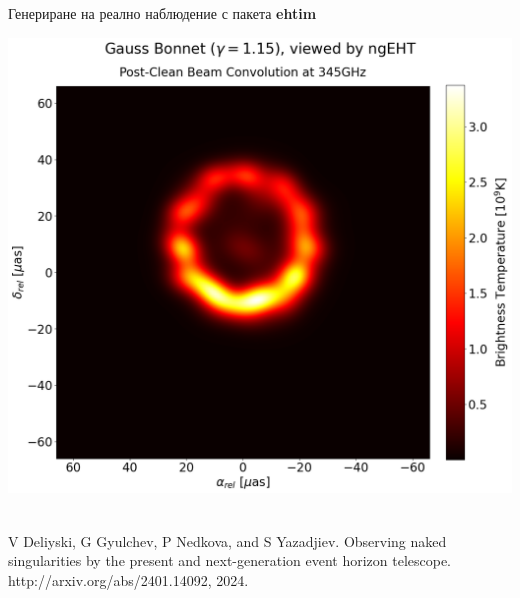 \documentclass[hyperref={colorlinks,citecolor=blue,linkcolor=blue,urlcolor=blue}]{beamer}
\begin{document}
\begin{frame}{Генериране на реално наблюдение с пакета \textbf{ehtim}}
\begin{minipage}{13em}
			\includegraphics[scale = 0.14]{Pre-Defence/Ehtim_plot_ngEHT_345.png}
		\end{minipage}\\
		
		\tiny V Deliyski, G Gyulchev, P Nedkova, and S Yazadjiev.
		Observing naked singularities by the present and next-generation event horizon
		telescope. http://arxiv.org/abs/2401.14092, 2024.
	\end{frame}
	
\end{document}
